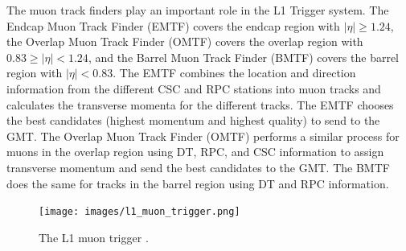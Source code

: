 The muon track finders play an important role in the L1 Trigger system. The Endcap Muon Track Finder (EMTF) covers the endcap region with $|\eta| \geq 1.24$, the Overlap Muon Track Finder (OMTF) covers the overlap region with $0.83 \geq |\eta| < 1.24$, and the Barrel Muon Track Finder (BMTF) covers the barrel region with $|\eta| < 0.83$. The EMTF combines the location and direction information from the different CSC and RPC stations into muon tracks and calculates the transverse momenta for the different tracks. The EMTF chooses the best candidates (highest momentum and highest quality) to send to the GMT. The Overlap Muon Track Finder (OMTF) performs a similar process for muons in the overlap region using DT, RPC, and CSC information to assign transverse momentum and send the best candidates to the GMT. The BMTF does the same for tracks in the barrel region using DT and RPC information. 

\begin{figure}[h!]
  \centering
  \texttt{[image: images/l1\_muon\_trigger.png]}
  \caption[The L1 muon trigger.]
   {The L1 muon trigger \cite{tdr2013}.}
  \label{fig:l1trigarch}
\end{figure}
